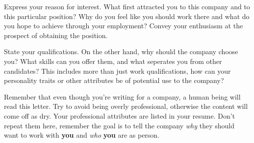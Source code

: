 \documentclass[letterpaper]{easyCover}
\begin{document}

\small{}


\begin{main}[14pt]
Express your reason for interest.  What first attracted you to this company and to this particular position?
Why do you feel like you should work there and what do you hope to achieve through your employment?
Convey your enthusiasm at the prospect of obtaining the position.

State your qualifications.  On the other hand, why should the company choose you?
What skills can you offer them, and what seperates you from other candidates?
This includes more than just work qualifications, how can your personality traits or other attributes
be of potential use to the company?

Remember that even though you're writing for a company, a human being will read this letter.
Try to avoid being overly professional, otherwise the content will come off as dry.  Your professional
attributes are listed in your resume.  Don't repeat them here, remember the goal is to tell the company
\textit{why} they should want to work with \textbf{you} and \textit{who} \textbf{you} are as person.

\end{main}
\end{document}
